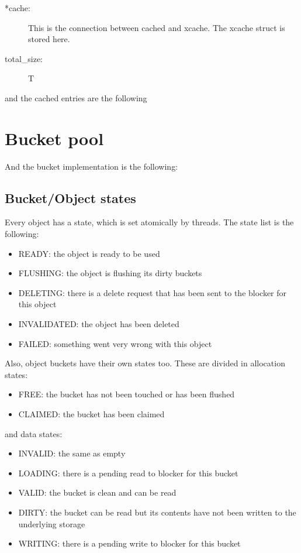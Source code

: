 \begin{description}
	\item[*cache:]
		This is the connection between cached and xcache. The xcache struct is 
		stored here.
	\item[total\_size:]
		T
\end{description}

and the cached entries are the following


\section{Bucket pool}

And the bucket implementation is the following:


\subsection{Bucket/Object states}

Every object has a state, which is set atomically by threads. The state list is
the following:

\begin{itemize}
	\item READY: the object is ready to be used
	\item FLUSHING: the object is flushing its dirty buckets
	\item DELETING: there is a delete request that has been sent to the 
		blocker for this object
	\item INVALIDATED: the object has been deleted
	\item FAILED: something went very wrong with this object
\end{itemize}

Also, object buckets have their own states too. These are divided in allocation 
states:

\begin{itemize}
	\item FREE: the bucket has not been touched or has been flushed
	\item CLAIMED: the bucket has been claimed
\end{itemize}

and data states:

\begin{itemize}
	\item INVALID: the same as empty
	\item LOADING: there is a pending read to blocker for this bucket
	\item VALID: the bucket is clean and can be read
	\item DIRTY: the bucket can be read but its contents have not been
		written to the underlying storage
	\item WRITING: there is a pending write to blocker for this bucket
\end{itemize}

